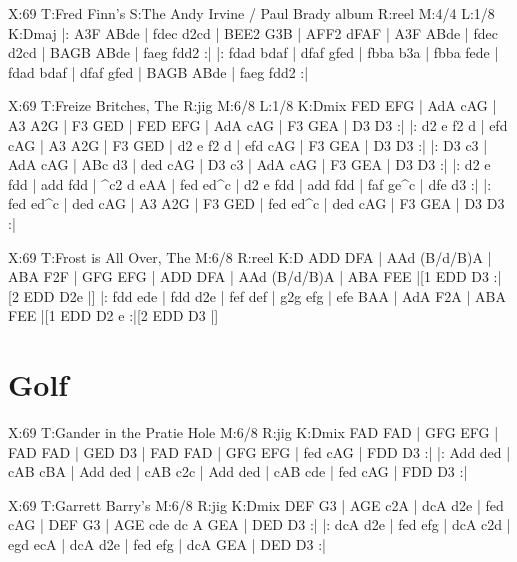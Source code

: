 \documentclass{article}
\begin{document}
\begin{abc}[name]
X:69
T:Fred Finn's
S:The Andy Irvine / Paul Brady album
R:reel
M:4/4
L:1/8
K:Dmaj
|: A3F ABde | fdec d2cd | BEE2 G3B | AFF2 dFAF |
A3F ABde | fdec d2cd | BAGB ABde | faeg fdd2 :|
|: fdad bdaf | dfaf gfed | fbba b3a | fbba fede |
fdad bdaf | dfaf gfed | BAGB ABde | faeg fdd2 :|
\end{abc}

\begin{abc}[name]
X:69
T:Freize Britches, The
R:jig
M:6/8
L:1/8
K:Dmix
FED EFG | AdA cAG | A3 A2G | F3 GED |
FED EFG | AdA cAG | F3 GEA | D3 D3 :|
|: d2 e f2 d | efd cAG | A3 A2G | F3 GED |
d2 e f2 d | efd cAG | F3 GEA | D3 D3 :|
|: D3 c3 | AdA cAG | ABc d3 | ded cAG |
D3 c3 | AdA cAG | F3 GEA | D3 D3 :|
|: d2 e fdd | add fdd | ^c2 d eAA | fed ed^c |
d2 e fdd | add fdd | faf ge^c | dfe d3 :|
|: fed ed^c | ded cAG | A3 A2G | F3 GED |
fed ed^c | ded cAG | F3 GEA | D3 D3 :|
\end{abc}

\begin{abc}[name]
X:69
T:Frost is All Over, The
M:6/8
R:reel
K:D
ADD DFA | AAd (B/d/B)A | ABA F2F | GFG EFG |
ADD DFA | AAd (B/d/B)A | ABA FEE |[1 EDD D3 :|[2 EDD D2e |]
|: fdd ede | fdd d2e | fef def | g2g efg |
efe BAA | AdA F2A | ABA FEE |[1 EDD D2 e :|[2 EDD D3 |]
\end{abc}

\section{Golf}

\begin{abc}[name]
X:69
T:Gander in the Pratie Hole
M:6/8
R:jig
K:Dmix
FAD FAD | GFG EFG | FAD FAD | GED D3 |
FAD FAD | GFG EFG | fed cAG | FDD D3 :|
|: Add ded | cAB cBA | Add ded | cAB c2c |
Add ded | cAB cde | fed cAG | FDD D3 :|
\end{abc}

\begin{abc}[name]
X:69
T:Garrett Barry's
M:6/8
R:jig
K:Dmix
DEF G3 | AGE c2A | dcA d2e | fed cAG |
DEF G3 | AGE cde  dc A GEA | DED D3 :|
|: dcA d2e | fed efg | dcA c2d | egd ecA |
dcA d2e | fed efg | dcA GEA | DED D3 :|
\end{abc}
\end{document}
